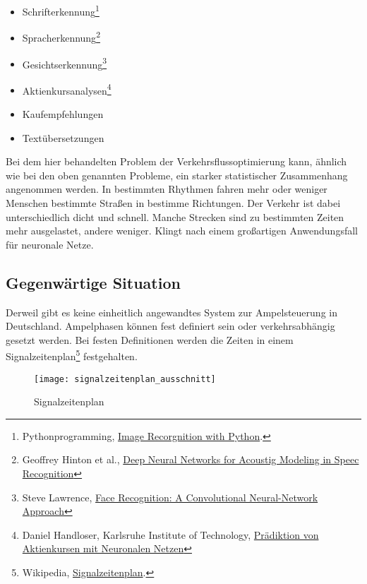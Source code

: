 \begin{multicols}{2}
\begin{itemize}
  \item Schrifterkennung\footnote{Pythonprogramming, \href{https://pythonprogramming.net/image-recognition-python/}{Image Recorgnition with Python}.}
  \item Spracherkennung\footnote{Geoffrey Hinton et al., \href{https://www.microsoft.com/en-us/research/wp-content/uploads/2016/02/HintonDengYuEtAl-SPM2012.pdf}{Deep Neural Networks for Acoustig Modeling in Speec Recognition}}
  \item Gesichtserkennung\footnote{Steve Lawrence, \href{http://www.cs.cmu.edu/afs/cs/user/bhiksha/WWW/courses/deeplearning/Fall.2016/pdfs/Lawrence_et_al.pdf}{Face Recognition: A Convolutional Neural-Network Approach}}
  \item Aktienkursanalysen\footnote{Daniel Handloser, Karlsruhe Institute of Technology, \href{http://isl.anthropomatik.kit.edu/pdf/Handloser2017.pdf}{Prädiktion von Aktienkursen mit Neuronalen Netzen}}
  \item Kaufempfehlungen
  \item Textübersetzungen
\end{itemize}
\end{multicols}

Bei dem hier behandelten Problem der Verkehrsflussoptimierung kann, ähnlich wie bei den oben genannten Probleme, ein starker statistischer Zusammenhang angenommen werden. In bestimmten Rhythmen fahren mehr oder weniger Menschen bestimmte Straßen in bestimme Richtungen. Der Verkehr ist dabei unterschiedlich dicht und schnell. Manche Strecken sind zu bestimmten Zeiten mehr ausgelastet, andere weniger. Klingt nach einem großartigen Anwendungsfall für neuronale Netze.

\subsection{Gegenwärtige Situation}

Derweil gibt es keine einheitlich angewandtes System zur Ampelsteuerung in Deutschland. Ampelphasen können fest definiert sein oder verkehrsabhängig gesetzt werden. Bei festen Definitionen werden die Zeiten in einem Signalzeitenplan\footnote{Wikipedia, \href{https://de.wikipedia.org/wiki/Signalzeitenplan}{Signalzeitenplan}.} festgehalten.

\begin{figure}[H]
    \centering
    \texttt{[image: signalzeitenplan\_ausschnitt]}
    \caption{Signalzeitenplan}
    \label{intro:signalzeitenplan}
\end{figure}

